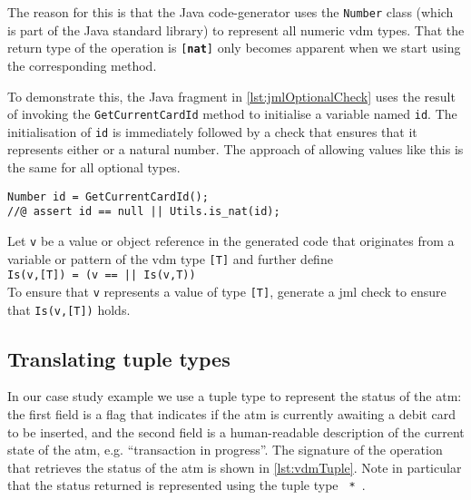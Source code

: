 \noindent The reason for this is that the Java code-generator uses the
\texttt{Number} class (which is part of the Java standard library) to
represent all numeric \ac{vdm} types. That the return type of the
operation is \texttt{[\textbf{nat}]} only becomes apparent when we
start using the corresponding method.

To demonstrate this, the Java fragment in
\autoref{lst:jmlOptionalCheck} uses the result of invoking the
\texttt{GetCurrentCardId} method to initialise a variable named
\texttt{id}. The initialisation of \texttt{id} is immediately followed
by a check that ensures that it represents either  or a
natural number. The approach of allowing  values like this is
the same for all optional types.


\begin{lstlisting}[style=customJml,caption={Use of the
\texttt{GetCurrentCardId} method in the generated
code.},label={lst:jmlOptionalCheck}]
Number id = GetCurrentCardId();
//@ assert id == null || Utils.is_nat(id);
\end{lstlisting}

 {Let \texttt{v} be a value or
  object reference in the generated code that originates from a
  variable or pattern of the \ac{vdm} type \texttt{[T]} and further define\\
  \texttt{Is(v,[T]) = (v ==  || Is(v,T))}\\
  To ensure that \texttt{v} represents a value of type \texttt{[T]},
  generate a \ac{jml} check to ensure that \texttt{Is(v,[T])} holds.}

\subsection{Translating tuple types}
\label{sec:tuples}

In our case study example we use a tuple type to represent the status
of the \ac{atm}: the first field is a  flag that indicates
if the \ac{atm} is currently awaiting a debit card to be inserted, and
the second field is a human-readable description of the current state
of the \ac{atm}, e.g. ``transaction in progress''. The signature of
the operation that retrieves the status of the \ac{atm} is shown in
\autoref{lst:vdmTuple}. Note in particular that the status returned is
represented using the tuple type \texttt{ * }.

